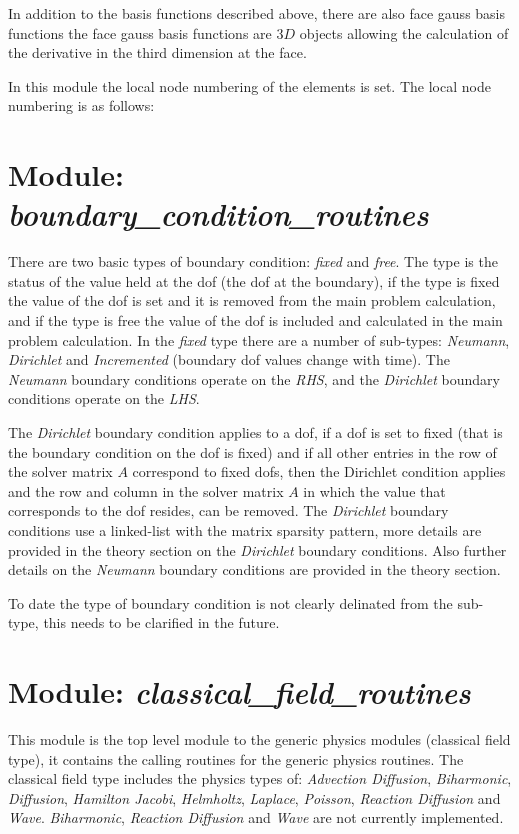 In addition to the basis functions described above, there are also face gauss 
basis functions the face gauss basis functions are $3D$ objects allowing the 
calculation of the derivative in the third dimension at the face.

In this module the local node numbering of the elements is set. The local node 
numbering is as follows:


\section{Module: \emph{boundary\_condition\_routines}} 
\label{sec:boundaryconditionroutines}

There are two basic types of boundary condition: \emph{fixed} and 
\emph{free}. The type is the status of the value held at the dof (the 
dof at the boundary), if the type is fixed the value of the dof is 
set and it is removed from the main problem calculation, and if the type 
is free the value of the dof is included and calculated in the main 
problem calculation. In the \emph{fixed} type there are a number of 
sub-types: \emph{Neumann}, \emph{Dirichlet} and \emph{Incremented} 
(boundary dof values change with time). The \emph{Neumann} boundary 
conditions operate on the \emph{RHS}, and the \emph{Dirichlet} boundary 
conditions operate on the \emph{LHS}. 

The \emph{Dirichlet} boundary condition applies to a dof, if a dof is 
set to fixed (that is the boundary condition on the dof is fixed) and 
if all other entries in the row of the solver matrix $A$ correspond to 
fixed dofs, then the Dirichlet condition applies and the row and column 
in the solver matrix $A$ in which the value that corresponds to the dof 
resides, can be removed. The \emph{Dirichlet} boundary conditions use 
a linked-list with the matrix sparsity pattern, more details are provided 
in the theory section on the \emph{Dirichlet} boundary conditions. Also 
further details on the \emph{Neumann} boundary conditions are provided 
in the theory section.

To date the type of boundary condition is not clearly delinated from the 
sub-type, this needs to be clarified in the future. 


\section{Module: \emph{classical\_field\_routines}}
\label{sec:classicalfieldroutines}

This module is the top level module to the generic physics modules (classical 
field type), it contains the calling routines for the generic physics routines. 
The classical field type includes the physics types of: \emph{Advection
Diffusion}, \emph{Biharmonic}, \emph{Diffusion}, \emph{Hamilton Jacobi}, 
\emph{Helmholtz}, \emph{Laplace}, \emph{Poisson}, \emph{Reaction Diffusion} 
and \emph{Wave}. \emph{Biharmonic}, \emph{Reaction Diffusion} and \emph{Wave} 
are not currently implemented.


